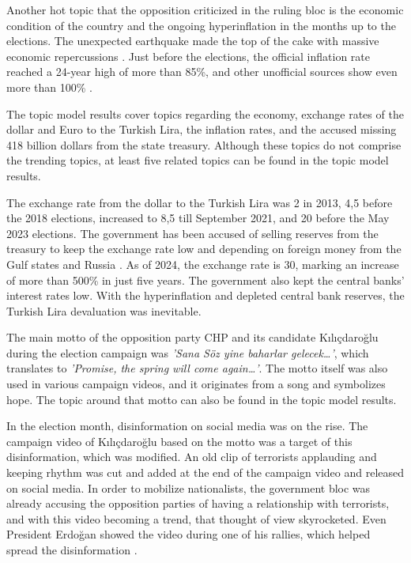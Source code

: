 Another hot topic that the opposition criticized in the ruling bloc is the economic condition of the country 
and the ongoing hyperinflation in the months up to the elections. The unexpected earthquake made the top 
of the cake with massive economic repercussions \parencite{cevik_aksoy_turkey_earthquake_2023}. Just 
before the elections, the official infla­tion rate reached a 24-year high of more than 85\%, 
and other unofficial sources show even more than 100\% \parencite{edgar_sar_opposition_election_agenda_2023}. 

The topic model results cover topics regarding the economy, exchange rates of the dollar and Euro to the 
Turkish Lira, the inflation rates, and the accused missing 418 billion dollars from the state treasury. 
Although these topics do not comprise the trending topics, at least five related topics can be found in the 
topic model results.

The exchange rate from the dollar to the Turkish Lira was 2 in 2013, 4,5 before the 2018 elections, 
increased to 8,5 till September 2021, and 20 before the May 2023 elections. The government has been accused 
of selling reserves from the treasury to keep the exchange rate low and depending on foreign money from the 
Gulf states and Russia \parencite{edgar_sar_opposition_election_agenda_2023}. As of 2024, the exchange 
rate is 30, marking an increase of more than 500\% in just five years.
The government also kept the central banks' interest rates low. With the hyperinflation and depleted 
central bank reserves, the Turkish Lira devaluation was inevitable.

The main motto of the opposition party CHP and its candidate Kılıçdaroğlu during the election campaign 
was \textit{'Sana Söz yine baharlar gelecek\ldots'}, which translates to 
\textit{'Promise, the spring will come again\ldots'}. 
The motto itself was also used in various campaign videos, and it originates from a song and symbolizes 
hope. The topic around that motto can also be found in the topic model results.

In the election month, disinformation on social media was on the rise. The campaign video of Kılıçdaroğlu 
based on the motto was a target of this disinformation, which was modified. An old clip of terrorists 
applauding and keeping rhythm was cut and added at the end of the campaign video and released on social 
media. In order to mobilize nationalists, the government bloc was already accusing the opposition parties 
of having a relationship with terrorists, and with this video becoming a trend, that thought of view 
skyrocketed. Even President Erdoğan showed the video during one of his rallies, which helped spread the 
disinformation \parencite{ogras_disinformation_chp_pkk_2024}.

